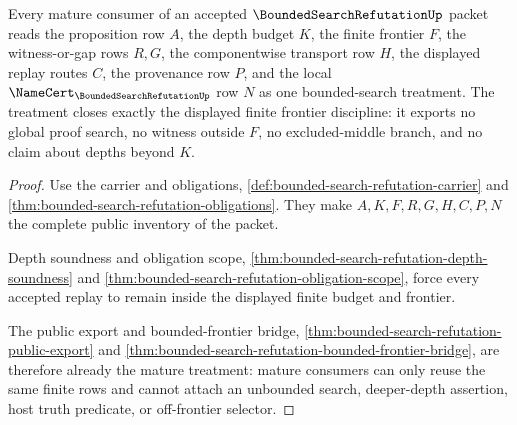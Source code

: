 \begin{theorem}
\label{thm:bounded-search-refutation-mature-treatment}
Every mature consumer of an accepted $\BoundedSearchRefutationUp$ packet reads the proposition row $A$, the depth budget $K$, the finite frontier $F$, the witness-or-gap rows $R,G$, the componentwise transport row $H$, the displayed replay routes $C$, the provenance row $P$, and the local $\NameCert_{\BoundedSearchRefutationUp}$ row $N$ as one bounded-search treatment. The treatment closes exactly the displayed finite frontier discipline: it exports no global proof search, no witness outside $F$, no excluded-middle branch, and no claim about depths beyond $K$.
\end{theorem}
\begin{proof}
Use the carrier and obligations, \autoref{def:bounded-search-refutation-carrier} and \autoref{thm:bounded-search-refutation-obligations}. They make $A,K,F,R,G,H,C,P,N$ the complete public inventory of the packet.

Depth soundness and obligation scope, \autoref{thm:bounded-search-refutation-depth-soundness} and \autoref{thm:bounded-search-refutation-obligation-scope}, force every accepted replay to remain inside the displayed finite budget and frontier.

The public export and bounded-frontier bridge, \autoref{thm:bounded-search-refutation-public-export} and \autoref{thm:bounded-search-refutation-bounded-frontier-bridge}, are therefore already the mature treatment: mature consumers can only reuse the same finite rows and cannot attach an unbounded search, deeper-depth assertion, host truth predicate, or off-frontier selector.
\end{proof}


